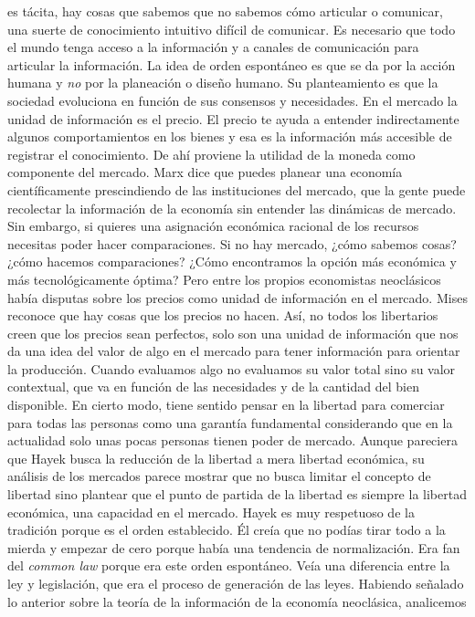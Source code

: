 \documentclass[
]{article}
\begin{document}
es tácita, hay cosas que sabemos que no sabemos cómo articular o
comunicar, una suerte de conocimiento intuitivo difícil de comunicar. Es
necesario que todo el mundo tenga acceso a la información y a canales de
comunicación para articular la información. La idea de orden espontáneo
es que se da por la acción humana y \emph{no} por la planeación o diseño
humano. Su planteamiento es que la sociedad evoluciona en función de sus
consensos y necesidades. En el mercado la unidad de información es el
precio. El precio te ayuda a entender indirectamente algunos
comportamientos en los bienes y esa es la información más accesible de
registrar el conocimiento. De ahí proviene la utilidad de la moneda como
componente del mercado. Marx dice que puedes planear una economía
científicamente prescindiendo de las instituciones del mercado, que la
gente puede recolectar la información de la economía sin entender las
dinámicas de mercado. Sin embargo, si quieres una asignación económica
racional de los recursos necesitas poder hacer comparaciones. Si no hay
mercado, ¿cómo sabemos cosas? ¿cómo hacemos comparaciones? ¿Cómo
encontramos la opción más económica y más tecnológicamente óptima? Pero
entre los propios economistas neoclásicos había disputas sobre los
precios como unidad de información en el mercado. Mises reconoce que hay
cosas que los precios no hacen. Así, no todos los libertarios creen que
los precios sean perfectos, solo son una unidad de información que nos
da una idea del valor de algo en el mercado para tener información para
orientar la producción. Cuando evaluamos algo no evaluamos su valor
total sino su valor contextual, que va en función de las necesidades y
de la cantidad del bien disponible. En cierto modo, tiene sentido pensar
en la libertad para comerciar para todas las personas como una garantía
fundamental considerando que en la actualidad solo unas pocas personas
tienen poder de mercado. Aunque pareciera que Hayek busca la reducción
de la libertad a mera libertad económica, su análisis de los mercados
parece mostrar que no busca limitar el concepto de libertad sino
plantear que el punto de partida de la libertad es siempre la libertad
económica, una capacidad en el mercado. Hayek es muy respetuoso de la
tradición porque es el orden establecido. Él creía que no podías tirar
todo a la mierda y empezar de cero porque había una tendencia de
normalización. Era fan del \emph{common law} porque era este orden
espontáneo. Veía una diferencia entre la ley y legislación, que era el
proceso de generación de las leyes. Habiendo señalado lo anterior sobre
la teoría de la información de la economía neoclásica, analicemos
\end{document}
